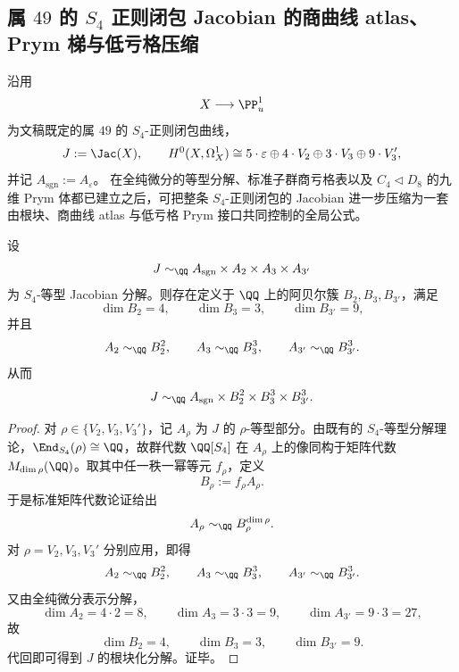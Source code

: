 \subsection{属 \texorpdfstring{$49$}{49} 的 \texorpdfstring{$S_4$}{S4} 正则闭包 Jacobian 的商曲线 atlas、Prym 梯与低亏格压缩}\label{subsec:conclusion-s4-quotient-atlas-prym-lowgenus-compression}
沿用
\[
X\longrightarrow \PP^1_u
\]
为文稿既定的属 \(49\) 的 \(S_4\)-正则闭包曲线，
\[
J:=\Jac(X),
\qquad
H^0(X,\Omega_X^1)\cong 5\cdot \varepsilon\oplus 4\cdot V_2\oplus 3\cdot V_3\oplus 9\cdot V_3',
\]
并记 \(A_{\mathrm{sgn}}:=A_{\varepsilon}\)。
在全纯微分的等型分解、标准子群商亏格表以及 \(C_4\triangleleft D_8\) 的九维 Prym 体都已建立之后，可把整条 \(S_4\)-正则闭包的 Jacobian 进一步压缩为一套由根块、商曲线 atlas 与低亏格 Prym 接口共同控制的全局公式。

\begin{theorem}\label{thm:conclusion-s4-jacobian-root-block-realization}
设
\[
J\sim_{\QQ}A_{\mathrm{sgn}}\times A_2\times A_3\times A_{3'}
\]
为 \(S_4\)-等型 Jacobian 分解。则存在定义于 \(\QQ\) 上的阿贝尔簇 \(B_2,B_3,B_{3'}\)，满足
\[
\dim B_2=4,\qquad \dim B_3=3,\qquad \dim B_{3'}=9,
\]
并且
\[
A_2\sim_{\QQ} B_2^{2},\qquad
A_3\sim_{\QQ} B_3^{3},\qquad
A_{3'}\sim_{\QQ} B_{3'}^{3}.
\]
从而
\[
J\sim_{\QQ} A_{\mathrm{sgn}}\times B_2^{2}\times B_3^{3}\times B_{3'}^{3}.
\]
\end{theorem}
\begin{proof}
对 \(\rho\in\{V_2,V_3,V_3'\}\)，记 \(A_\rho\) 为 \(J\) 的 \(\rho\)-等型部分。由既有的 \(S_4\)-等型分解理论，\(\End_{S_4}(\rho)\cong \QQ\)，故群代数 \(\QQ[S_4]\) 在 \(A_\rho\) 上的像同构于矩阵代数 \(M_{\dim \rho}(\QQ)\)。取其中任一秩一幂等元 \(f_\rho\)，定义
\[
B_\rho:=f_\rho A_\rho.
\]
于是标准矩阵代数论证给出
\[
A_\rho\sim_{\QQ} B_\rho^{\dim \rho}.
\]
对 \(\rho=V_2,V_3,V_3'\) 分别应用，即得
\[
A_2\sim_{\QQ}B_2^{2},\qquad
A_3\sim_{\QQ}B_3^{3},\qquad
A_{3'}\sim_{\QQ}B_{3'}^{3}.
\]
又由全纯微分表示分解，
\[
\dim A_2=4\cdot 2=8,\qquad
\dim A_3=3\cdot 3=9,\qquad
\dim A_{3'}=9\cdot 3=27,
\]
故
\[
\dim B_2=4,\qquad \dim B_3=3,\qquad \dim B_{3'}=9.
\]
代回即可得到 \(J\) 的根块化分解。证毕。
\end{proof}

